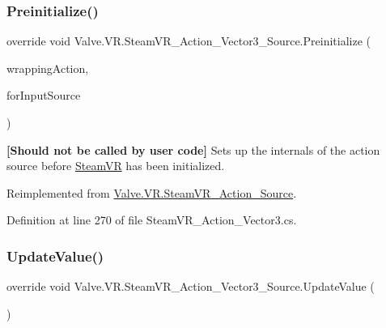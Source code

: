 \mbox{\label{class_valve_1_1_v_r_1_1_steam_v_r___action___vector3___source_a264e92c04f83a54bc6123c529db86a8c}} 
\subsubsection{\texorpdfstring{Preinitialize()}{Preinitialize()}}
{\footnotesize\ttfamily override void Valve.\+V\+R.\+Steam\+V\+R\+\_\+\+Action\+\_\+\+Vector3\+\_\+\+Source.\+Preinitialize (\begin{DoxyParamCaption}\item[{\mbox{\hyperlink{class_valve_1_1_v_r_1_1_steam_v_r___action}{Steam\+V\+R\+\_\+\+Action}}}]{wrapping\+Action,  }\item[{\mbox{\hyperlink{namespace_valve_1_1_v_r_a82e5bf501cc3aa155444ee3f0662853f}{Steam\+V\+R\+\_\+\+Input\+\_\+\+Sources}}}]{for\+Input\+Source }\end{DoxyParamCaption})\hspace{0.3cm}{\ttfamily [virtual]}}



{\bfseries{\mbox{[}Should not be called by user code\mbox{]}}} Sets up the internals of the action source before \mbox{\hyperlink{class_valve_1_1_v_r_1_1_steam_v_r}{Steam\+VR}} has been initialized. 



Reimplemented from \mbox{\hyperlink{class_valve_1_1_v_r_1_1_steam_v_r___action___source_aa2bec7f32b37595de01f1456a3fa5bfe}{Valve.\+V\+R.\+Steam\+V\+R\+\_\+\+Action\+\_\+\+Source}}.



Definition at line 270 of file Steam\+V\+R\+\_\+\+Action\+\_\+\+Vector3.\+cs.

\mbox{\label{class_valve_1_1_v_r_1_1_steam_v_r___action___vector3___source_aa88dba41707be49a5e0c2fa69447aab6}} 
\subsubsection{\texorpdfstring{UpdateValue()}{UpdateValue()}}
{\footnotesize\ttfamily override void Valve.\+V\+R.\+Steam\+V\+R\+\_\+\+Action\+\_\+\+Vector3\+\_\+\+Source.\+Update\+Value (\begin{DoxyParamCaption}{ }\end{DoxyParamCaption})\hspace{0.3cm}{\ttfamily [virtual]}}



